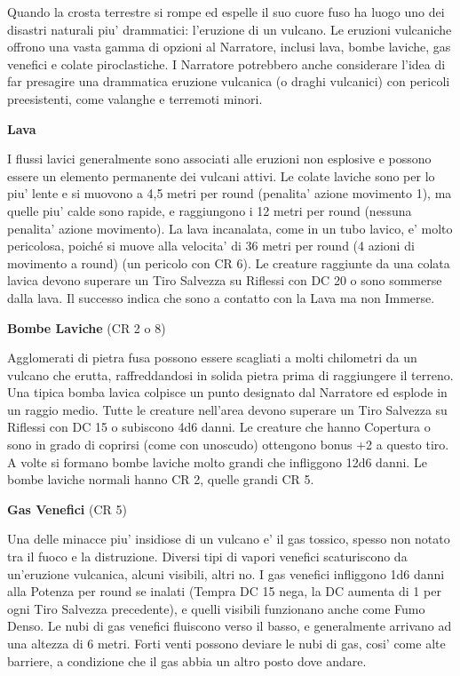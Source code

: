 \documentclass[a4paper,11pt,twoside,openany]{book}
\begin{document}
{Quando la crosta terrestre si rompe ed espelle il suo cuore fuso ha luogo uno dei disastri naturali piu' drammatici: l'eruzione di un vulcano. Le eruzioni vulcaniche offrono una vasta gamma di opzioni al Narratore, inclusi lava, bombe laviche, gas venefici e colate piroclastiche. I Narratore potrebbero anche considerare l'idea di far presagire una drammatica eruzione vulcanica (o draghi vulcanici) con pericoli preesistenti, come valanghe e terremoti minori.

\textbf{Lava}

I flussi lavici generalmente sono associati alle eruzioni non esplosive e possono essere un elemento permanente dei vulcani attivi. Le colate laviche sono per lo piu' lente e si muovono a 4,5 metri per round (penalita' azione movimento 1), ma quelle piu' calde sono rapide, e raggiungono i 12 metri per round (nessuna penalita' azione movimento). La lava incanalata, come in un tubo lavico, e' molto pericolosa, poiché si muove alla velocita' di 36 metri per round (4 azioni di movimento a round) (un pericolo con CR 6). Le creature raggiunte da una colata lavica devono superare un Tiro Salvezza su Riflessi con DC 20 o sono sommerse dalla lava. Il successo indica che sono a contatto con la Lava ma non Immerse.

\textbf{Bombe Laviche} (CR 2 o 8)

Agglomerati di pietra fusa possono essere scagliati a molti chilometri da un vulcano che erutta, raffreddandosi in solida pietra prima di raggiungere il terreno. Una tipica bomba lavica colpisce un punto designato dal Narratore ed esplode in un raggio medio. Tutte le creature nell'area devono superare un Tiro Salvezza su Riflessi con DC 15 o subiscono 4d6 danni. Le creature che hanno Copertura o sono in grado di coprirsi (come con uno­scudo) ottengono bonus +2 a questo tiro. A volte si formano bombe laviche molto grandi che infliggono 12d6 danni. Le bombe laviche normali hanno CR 2, quelle grandi CR 5.

\textbf{Gas Venefici} (CR 5)

Una delle minacce piu' insidiose di un vulcano e' il gas tossico, spesso non notato tra il fuoco e la distruzione. Diversi tipi di vapori venefici scaturiscono da un'eruzione vulcanica, alcuni visibili, altri no. I gas venefici infliggono 1d6 danni alla Potenza per round se inalati (Tempra DC 15 nega, la DC aumenta di 1 per ogni Tiro Salvezza precedente), e quelli visibili funzionano anche come Fumo Denso. Le nubi di gas venefici fluiscono verso il basso, e generalmente arrivano ad una altezza di 6 metri. Forti venti possono deviare le nubi di gas, cosi' come alte barriere, a condizione che il gas abbia un altro posto dove andare.

}
\end{document}
